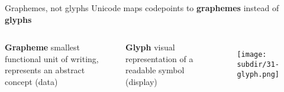 \documentclass[../index.tex]{subfiles}
\begin{document}
\renewcommand{\currenttitle}{Graphemes, not glyphs}
\begin{frame}{\currenttitle}
%
%
%
%
  Unicode maps codepoints to \textbf{graphemes} instead of \textbf{glyphs} \\[1.5em]
  \begin{columns}[t]
    \textbf{Grapheme} \textendash{}
        smallest functional unit of writing, represents an abstract concept (data)

    \textbf{Glyph} \textendash{}
        visual representation of a readable symbol (display) \\[2em]
    \begin{figure}
      \centering
      \texttt{[image: \\subdir/31-glyph.png]}
    \end{figure}
  \end{columns}
\end{frame}
\end{document}
